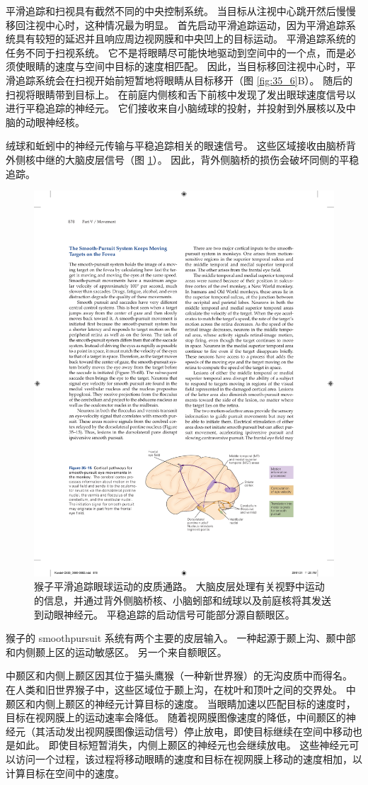 平滑追踪和扫视具有截然不同的中央控制系统。 当目标从注视中心跳开然后慢慢移回注视中心时，这种情况最为明显。 首先启动平滑追踪运动，因为平滑追踪系统具有较短的延迟并且响应周边视网膜和中央凹上的目标运动。 平滑追踪系统的任务不同于扫视系统。 它不是将眼睛尽可能快地驱动到空间中的一个点，而是必须使眼睛的速度与空间中目标的速度相匹配。 因此，当目标移回注视中心时，平滑追踪系统会在扫视开始前短暂地将眼睛从目标移开（图 \ref{fig:35_6}B）。 随后的扫视将眼睛带到目标上。 在前庭内侧核和舌下前核中发现了发出眼球速度信号以进行平稳追踪的神经元。 它们接收来自小脑绒球的投射，并投射到外展核以及中脑的动眼神经核。

绒球和蚯蚓中的神经元传输与平稳追踪相关的眼速信号。 
这些区域接收由脑桥背外侧核中继的大脑皮层信号（图 \ref{fig:35_15}）。
因此，背外侧脑桥的损伤会破坏同侧的平稳追踪。

\begin{figure}[htbp]
	\centering
	\includegraphics[width=0.7\linewidth]{chap35/fig_35_15}
	\caption{猴子平滑追踪眼球运动的皮质通路。 大脑皮层处理有关视野中运动的信息，并通过背外侧脑桥核、小脑蚓部和绒球以及前庭核将其发送到动眼神经元。 平稳追踪的启动信号可能部分源自额眼区。}
	\label{fig:35_15}
\end{figure}

猴子的 smoothpursuit 系统有两个主要的皮层输入。 一种起源于颞上沟、颞中部和内侧颞上区的运动敏感区。 另一个来自额眼区。

中颞区和内侧上颞区因其位于猫头鹰猴（一种新世界猴）的无沟皮质中而得名。 在人类和旧世界猴子中，这些区域位于颞上沟，在枕叶和顶叶之间的交界处。 中颞区和内侧上颞区的神经元计算目标的速度。 当眼睛加速以匹配目标的速度时，目标在视网膜上的运动速率会降低。 随着视网膜图像速度的降低，中间颞区的神经元（其活动发出视网膜图像运动信号）停止放电，即使目标继续在空间中移动也是如此。 即使目标短暂消失，内侧上颞区的神经元也会继续放电。 这些神经元可以访问一个过程，该过程将移动眼睛的速度和目标在视网膜上移动的速度相加，以计算目标在空间中的速度。

